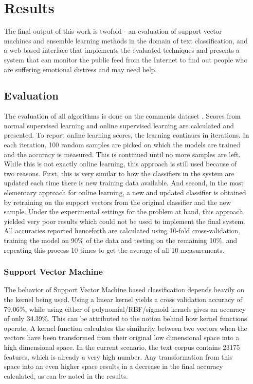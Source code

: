 \chapter{Results}
\label{chapter:Results}

The final output of this work is twofold - an evaluation of support vector machines and ensemble learning methods in the domain of text classification, and a web based interface that implements the evaluated techniques and presents a system that can monitor the public feed from the Internet to find out people who are suffering emotional distress and may need help.

\section{Evaluation}
\label{section:evaluation}
The evaluation of all algorithms is done on the comments dataset \cite{kaggle}. Scores from normal supervised learning and online supervised learning are calculated and presented. To report online learning scores, the learning continues in iterations. In each iteration, 100 random samples are picked on which the models are trained and the accuracy is measured. This is continued until no more samples are left. While this is not exactly online learning, this approach is still used because of two reasons. First, this is very similar to how the classifiers in the system are updated each time there is new training data available. And second, in the most elementary approach for online learning, a new and updated classifier is obtained by retraining on the support vectors from the original classifier and the new sample. Under the experimental settings for the problem at hand, this approach yielded very poor results which could not be used to implement the final system. All accuracies reported henceforth are calculated using 10-fold cross-validation, training the model on 90\% of the data and testing on the remaining 10\%, and repeating this process 10 times to get the average of all 10 measurements.

\subsection{Support Vector Machine}
The behavior of Support Vector Machine based classification depends heavily on the kernel being used. Using a linear kernel yields a cross validation accuracy of 79.06\%, while using either of polynomial/RBF/sigmoid kernels gives an accuracy of only 34.39\%. This can be attributed to the notion behind how kernel functions operate. A kernel function calculates the similarity between two vectors when the vectors have been transformed from their original low dimensional space into a high dimensional space. In the current scenario, the text corpus contains 23175 features, which is already a very high number. Any transformation from this space into an even higher space results in a decrease in the final accuracy calculated, as can be noted in the results.


